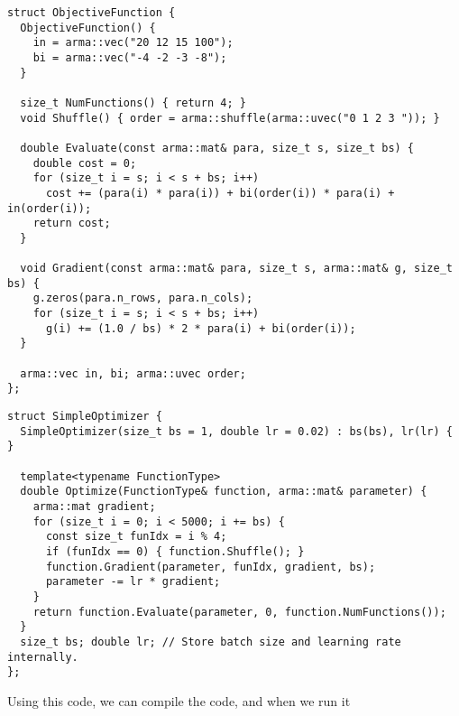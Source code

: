 \documentclass{article}
\begin{document}
\begin{verbatim}
struct ObjectiveFunction {
  ObjectiveFunction() {
    in = arma::vec("20 12 15 100");
    bi = arma::vec("-4 -2 -3 -8");
  }

  size_t NumFunctions() { return 4; }
  void Shuffle() { order = arma::shuffle(arma::uvec("0 1 2 3 ")); }

  double Evaluate(const arma::mat& para, size_t s, size_t bs) {
    double cost = 0;
    for (size_t i = s; i < s + bs; i++)
      cost += (para(i) * para(i)) + bi(order(i)) * para(i) + in(order(i));
    return cost;
  }

  void Gradient(const arma::mat& para, size_t s, arma::mat& g, size_t bs) {
    g.zeros(para.n_rows, para.n_cols);
    for (size_t i = s; i < s + bs; i++)
      g(i) += (1.0 / bs) * 2 * para(i) + bi(order(i));
  }

  arma::vec in, bi; arma::uvec order;
};
\end{verbatim}
\begin{verbatim}
struct SimpleOptimizer {
  SimpleOptimizer(size_t bs = 1, double lr = 0.02) : bs(bs), lr(lr) { }

  template<typename FunctionType>
  double Optimize(FunctionType& function, arma::mat& parameter) {
    arma::mat gradient;
    for (size_t i = 0; i < 5000; i += bs) {
      const size_t funIdx = i % 4;
      if (funIdx == 0) { function.Shuffle(); }
      function.Gradient(parameter, funIdx, gradient, bs);
      parameter -= lr * gradient;
    }
    return function.Evaluate(parameter, 0, function.NumFunctions());
  }
  size_t bs; double lr; // Store batch size and learning rate internally.
};
\end{verbatim}
Using this code, we can compile the code, and when we run it
\end{document}
